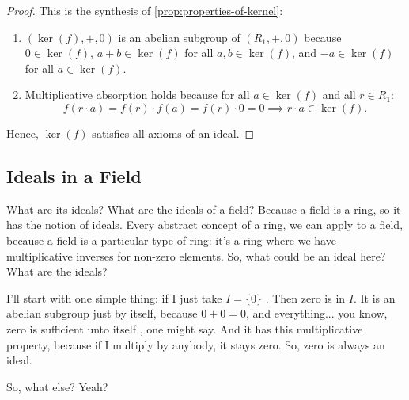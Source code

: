 \begin{content}

\begin{proof}
This is the synthesis of \cref{prop:properties-of-kernel}:
\begin{enumerate}[label=\textbf{(\arabic*)}]
    \item $(\ker(f), +, 0)$ is an abelian subgroup of $(R_1, +, 0)$ because $0 \in \ker(f)$, $a + b \in \ker(f)$ for all $a, b \in \ker(f)$, and $-a \in \ker(f)$ for all $a \in \ker(f)$.
    \item Multiplicative absorption holds because for all $a \in \ker(f)$ and all $r \in R_1$:
    \[
    f(r \cdot a) = f(r) \cdot f(a) = f(r) \cdot 0 = 0 \implies r \cdot a \in \ker(f).
    \]
\end{enumerate}
Hence, $\ker(f)$ satisfies all axioms of an ideal.
\end{proof}
\end{content}

\subsection{Ideals in a Field}

\begin{speech}[00:39:13 - 00:40:05]
What are its ideals? What are the ideals of a field? Because a field is a ring, so it has the notion of ideals. Every abstract concept of a ring, we can apply to a field, because a field is a particular type of ring: it's a ring where we have multiplicative inverses for non-zero elements. So, what could be an ideal here? What are the ideals?

I'll start with one simple thing: if I just take $I = \{0\}$ . Then zero is in $I$. It is an abelian subgroup just by itself, because $0 + 0 = 0$, and everything... you know, zero is sufficient unto itself , one might say. And it has this multiplicative property, because if I multiply by anybody, it stays zero. So, zero is always an ideal.

So, what else? Yeah? 
\end{speech}

